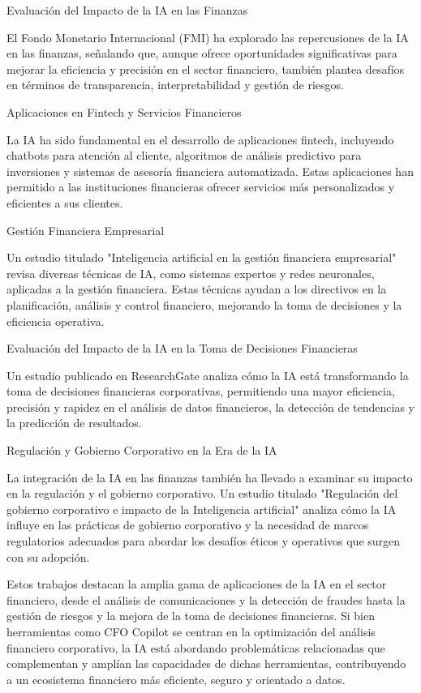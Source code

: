 \documentclass[12pt,letterpaper,oneside]{report}
\renewcommand{\_}{\UnderscoreOriginal\allowbreak}
\begin{document}
Evaluación del Impacto de la IA en las Finanzas \parencite{Kearns2023}

El Fondo Monetario Internacional (FMI) ha explorado las repercusiones de la IA en las finanzas, señalando que, aunque ofrece oportunidades significativas para mejorar la eficiencia y precisión en el sector financiero, también plantea desafíos en términos de transparencia, interpretabilidad y gestión de riesgos.

Aplicaciones en Fintech y Servicios Financieros \parencite{AdenBusinessMagazi2023}

La IA ha sido fundamental en el desarrollo de aplicaciones fintech, incluyendo chatbots para atención al cliente, algoritmos de análisis predictivo para inversiones y sistemas de asesoría financiera automatizada. Estas aplicaciones han permitido a las instituciones financieras ofrecer servicios más personalizados y eficientes a sus clientes.

Gestión Financiera Empresarial \parencite{SosaSierra2007}

Un estudio titulado "Inteligencia artificial en la gestión financiera empresarial" revisa diversas técnicas de IA, como sistemas expertos y redes neuronales, aplicadas a la gestión financiera. Estas técnicas ayudan a los directivos en la planificación, análisis y control financiero, mejorando la toma de decisiones y la eficiencia operativa.

Evaluación del Impacto de la IA en la Toma de Decisiones Financieras \parencite{Andrade2023}

Un estudio publicado en ResearchGate analiza cómo la IA está transformando la toma de decisiones financieras corporativas, permitiendo una mayor eficiencia, precisión y rapidez en el análisis de datos financieros, la detección de tendencias y la predicción de resultados.

Regulación y Gobierno Corporativo en la Era de la IA \parencite{AlioLopez2022}

La integración de la IA en las finanzas también ha llevado a examinar su impacto en la regulación y el gobierno corporativo. Un estudio titulado "Regulación del gobierno corporativo e impacto de la Inteligencia artificial" analiza cómo la IA influye en las prácticas de gobierno corporativo y la necesidad de marcos regulatorios adecuados para abordar los desafíos éticos y operativos que surgen con su adopción.

Estos trabajos destacan la amplia gama de aplicaciones de la IA en el sector financiero, desde el análisis de comunicaciones y la detección de fraudes hasta la gestión de riesgos y la mejora de la toma de decisiones financieras. Si bien herramientas como CFO Copilot se centran en la optimización del análisis financiero corporativo, la IA está abordando problemáticas relacionadas que complementan y amplían las capacidades de dichas herramientas, contribuyendo a un ecosistema financiero más eficiente, seguro y orientado a datos.
\end{document}
